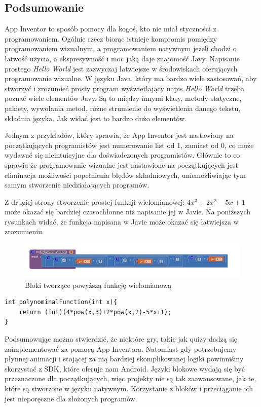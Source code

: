\subsection{Podsumowanie}


App Inventor to sposób pomocy dla kogoś, kto nie miał styczności z programowaniem. Ogólnie rzecz biorąc istnieje kompromis pomiędzy programowaniem wizualnym, a programowaniem natywnym jeżeli chodzi o łatwość użycia, a ekspresywność i moc jaką daje znajomość Javy. Napisanie prostego \emph{Hello World} jest zazwyczaj łatwiejsze w środowiskach oferujących programowanie wizualne. W języku Java, który ma bardzo wiele zastosowań, aby stworzyć i zrozumieć prosty program wyświetlający napis \emph{Hello World} trzeba poznać wiele elementów Javy. Są to między innymi klasy, metody statyczne, pakiety, wywołania metod, różne strumienie do wyświetlenia danego tekstu, składnia języka. Jak widać jest to bardzo dużo elementów. 

Jednym z przykładów, który sprawia, że App Inventor jest nastawiony na początkujących programistów jest numerowanie list od 1, zamiast od 0, co może wydawać się nieintuicyjne dla doświadczonych programistów. Głównie to co sprawia że programowanie wizualne jest nastawione na początkujących jest eliminacja możliwości popełnienia błędów składniowych, uniemożliwiając tym samym stworzenie niedziałających programów. 

Z drugiej strony stworzenie prostej funkcji wielomianowej: $4x^3+2x^2-5x+1$ może okazać się bardziej czasochłonne niż napisanie jej w Javie. 
Na poniższych rysunkach widać, że funkcja napisana w Javie może okazać się łatwiejsza w zrozumieniu.


\begin{figure}[H]
\centering\includegraphics[width=15cm]{figures/polynominalFunction}
\caption{Bloki tworzące powyższą funkcję wielomianową}
\end{figure}

\begin{lstlisting}
int polynominalFunction(int x){
	return (int)(4*pow(x,3)+2*pow(x,2)-5*x+1);
}
\end{lstlisting}


Podsumowując można stwierdzić, że niektóre gry, takie jak quizy dadzą się zaimplementować za pomocą App Inventora. Natomiast gdy potrzebujemy płynnej animacji i stojącej za nią bardziej skomplikowanej logiki powinniśmy skorzystać z SDK, które oferuje nam Android. Języki blokowe wydają się być przeznaczone dla początkujących, więc projekty nie są tak zaawansowane, jak te, które są stworzone w języku natywnym. Korzystanie z bloków i przeciąganie ich jest nieporęczne dla złożonych programów.

